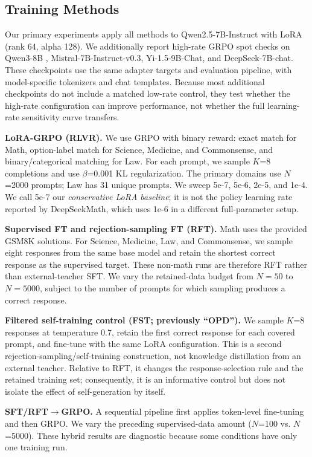 \documentclass[11pt]{article}
\begin{document}
\subsection{Training Methods}

Our primary experiments apply all methods to Qwen2.5-7B-Instruct \citep{qwen25} with LoRA \citep{hu2022lora} (rank 64, alpha 128). We additionally report high-rate GRPO spot checks on Qwen3-8B \citep{qwen3}, Mistral-7B-Instruct-v0.3, Yi-1.5-9B-Chat, and DeepSeek-7B-chat. These checkpoints use the same adapter targets and evaluation pipeline, with model-specific tokenizers and chat templates. Because most additional checkpoints do not include a matched low-rate control, they test whether the high-rate configuration can improve performance, not whether the full learning-rate sensitivity curve transfers.

\textbf{LoRA-GRPO (RLVR).} We use GRPO \citep{shao2024deepseekmath} with binary reward: exact match for Math, option-label match for Science, Medicine, and Commonsense, and binary/categorical matching for Law. For each prompt, we sample $K$=8 completions and use $\beta$=0.001 KL regularization. The primary domains use $N$=2000 prompts; Law has 31 unique prompts. We sweep 5e-7, 5e-6, 2e-5, and 1e-4. We call 5e-7 our \emph{conservative LoRA baseline}; it is not the policy learning rate reported by DeepSeekMath, which uses 1e-6 in a different full-parameter setup.

\textbf{Supervised FT and rejection-sampling FT (RFT).} Math uses the provided GSM8K solutions. For Science, Medicine, Law, and Commonsense, we sample eight responses from the same base model and retain the shortest correct response as the supervised target. These non-math runs are therefore RFT rather than external-teacher SFT. We vary the retained-data budget from $N=50$ to $N=5000$, subject to the number of prompts for which sampling produces a correct response.

\textbf{Filtered self-training control (FST; previously ``OPD'').} We sample $K$=8 responses at temperature 0.7, retain the first correct response for each covered prompt, and fine-tune with the same LoRA configuration. This is a second rejection-sampling/self-training construction, not knowledge distillation from an external teacher. Relative to RFT, it changes the response-selection rule and the retained training set; consequently, it is an informative control but does not isolate the effect of self-generation by itself.

\textbf{SFT/RFT$\to$GRPO.} A sequential pipeline first applies token-level fine-tuning and then GRPO. We vary the preceding supervised-data amount ($N$=100 vs. $N$=5000). These hybrid results are diagnostic because some conditions have only one training run.
\end{document}
